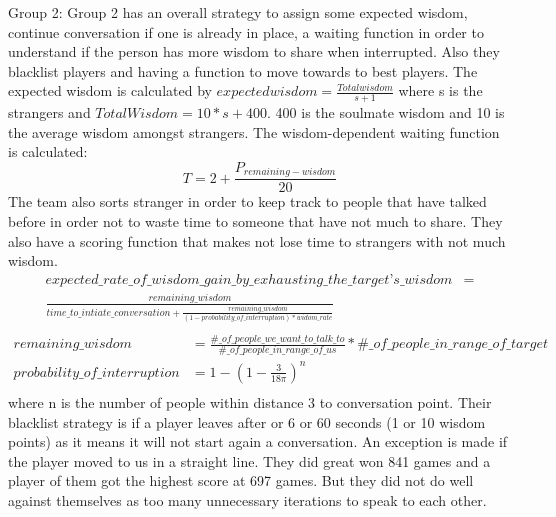 Group 2:
Group 2 has an overall strategy to assign some expected wisdom, continue conversation
if one is already in place, a waiting function in order to understand if the
person has more wisdom to share when interrupted. Also they blacklist players
and having a function to move towards to best players. The expected wisdom is
calculated by $expected wisdom = \frac{Total wisdom}{s+1}$ where s is the strangers
and $Total Wisdom = 10*s + 400$. 400 is the soulmate wisdom and 10 is the average
wisdom amongst strangers. The wisdom-dependent waiting function is calculated:
\begin{equation*}
T = 2 + \frac{P_{remaining-wisdom}}{20}
\end{equation*}
The team also sorts stranger in order to keep track to people that have talked 
before in order not to waste time to someone that have not much to share. They 
also have a scoring function that makes not lose time to strangers with not much
wisdom.
\begin{equation*}
\begin{aligned}
expected\_rate\_of\_wisdom\_gain\_by\_exhausting\_the\_target’s\_wisdom &=\\
 \frac{remaining\_wisdom}{time\_to\_intiate\_conversation + \frac{remaining\_wisdom}{(1- probability\_of\_interruption)* widom\_rate}} \\
\end{aligned}
\end{equation*}
\begin{equation*}
\begin{aligned}
remaining\_wisdom &= \frac{\#\_of\_people\_we\_want\_to\_talk\_to}{\#\_of\_people\_in\_range\_of\_us}*\#\_of\_people\_in\_range\_of\_target \\
probability\_of\_interruption &= 1 - (1-\frac{3}{18\pi})^n \\
\end{aligned}
\end{equation*}
where n is the number of people within distance 3 to conversation point. Their 
blacklist strategy is if a player leaves after or 6 or 60 seconds (1 or 10 wisdom 
points) as it means it will not start again a conversation. An exception is made
if the player moved to us in a straight line. They did great won 841 games and
a player of them got the highest score at 697 games. But they did not do well
against themselves as too many unnecessary iterations to speak to each other.

